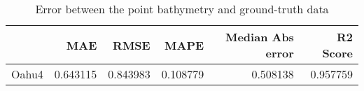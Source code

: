 \begin{table}[h!]
\caption{Error between the point bathymetry and ground-truth data}
\label{tab:Oahu4_lidar_error}
\begin{tabular}{lrrrrr}
\toprule
 & MAE & RMSE & MAPE & Median Abs error & R2 Score \\
\midrule
Oahu4 & 0.643115 & 0.843983 & 0.108779 & 0.508138 & 0.957759 \\
\bottomrule
\end{tabular}
\end{table}

